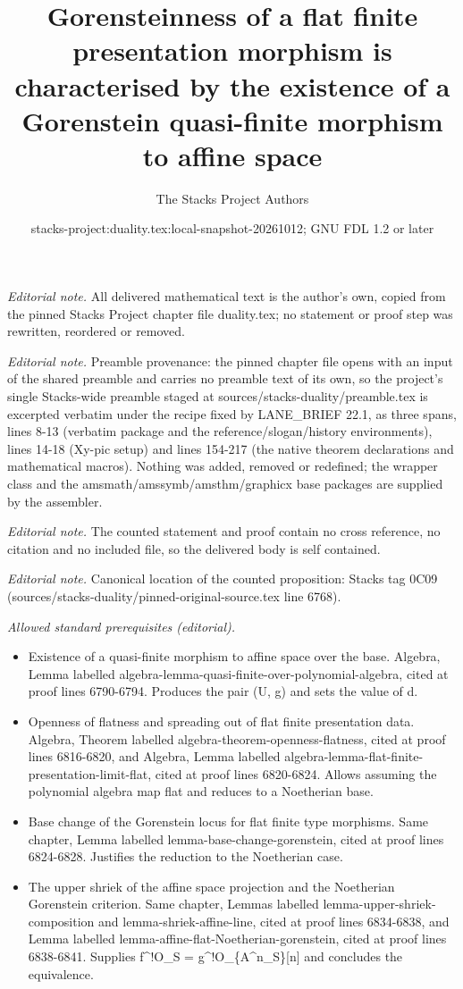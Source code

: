 \documentclass[10pt,a4paper]{amsart}
\title{Gorensteinness of a flat finite presentation morphism is characterised by the existence of a Gorenstein quasi-finite morphism to affine space}
\author{The Stacks Project Authors}
\date{stacks-project:duality.tex:local-snapshot-20261012; GNU FDL 1.2 or later}
\theoremstyle{plain}
\theoremstyle{definition}
\theoremstyle{remark}
\numberwithin{equation}{subsection}
\begin{document}
\maketitle
\noindent\textit{Editorial note.} All delivered mathematical text is the author's own, copied from the pinned Stacks Project chapter file duality.tex; no statement or proof step was rewritten, reordered or removed.\par\medskip
\noindent\textit{Editorial note.} Preamble provenance: the pinned chapter file opens with an input of the shared preamble and carries no preamble text of its own, so the project's single Stacks-wide preamble staged at sources/stacks-duality/preamble.tex is excerpted verbatim under the recipe fixed by LANE\_BRIEF 22.1, as three spans, lines 8-13 (verbatim package and the reference/slogan/history environments), lines 14-18 (Xy-pic setup) and lines 154-217 (the native theorem declarations and mathematical macros). Nothing was added, removed or redefined; the wrapper class and the amsmath/amssymb/amsthm/graphicx base packages are supplied by the assembler.\par\medskip
\noindent\textit{Editorial note.} The counted statement and proof contain no cross reference, no citation and no included file, so the delivered body is self contained.\par\medskip
\noindent\textit{Editorial note.} Canonical location of the counted proposition: Stacks tag 0C09 (sources/stacks-duality/pinned-original-source.tex line 6768).\par\medskip
\noindent\textit{Allowed standard prerequisites (editorial).}\begin{itemize}
\item Existence of a quasi-finite morphism to affine space over the base. Algebra, Lemma labelled algebra-lemma-quasi-finite-over-polynomial-algebra, cited at proof lines 6790-6794. Produces the pair (U, g) and sets the value of d.
\item Openness of flatness and spreading out of flat finite presentation data. Algebra, Theorem labelled algebra-theorem-openness-flatness, cited at proof lines 6816-6820, and Algebra, Lemma labelled algebra-lemma-flat-finite-presentation-limit-flat, cited at proof lines 6820-6824. Allows assuming the polynomial algebra map flat and reduces to a Noetherian base.
\item Base change of the Gorenstein locus for flat finite type morphisms. Same chapter, Lemma labelled lemma-base-change-gorenstein, cited at proof lines 6824-6828. Justifies the reduction to the Noetherian case.
\item The upper shriek of the affine space projection and the Noetherian Gorenstein criterion. Same chapter, Lemmas labelled lemma-upper-shriek-composition and lemma-shriek-affine-line, cited at proof lines 6834-6838, and Lemma labelled lemma-affine-flat-Noetherian-gorenstein, cited at proof lines 6838-6841. Supplies f\textasciicircum{}!O\_S = g\textasciicircum{}!O\_\{A\textasciicircum{}n\_S\}[n] and concludes the equivalence.
\end{itemize}\medskip
\end{document}
